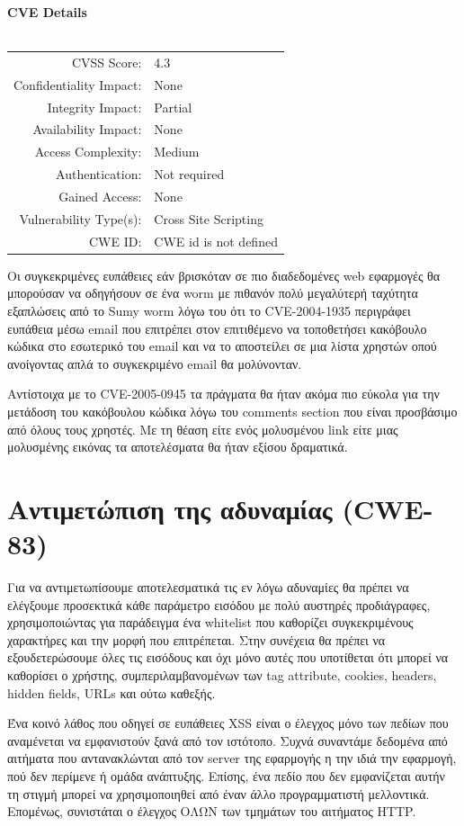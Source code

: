 \textbf{CVE Details}\\ \\
\begin{tabular}{rl}
\hline
CVSS Score: & 	4.3\\
Confidentiality Impact: & \noindent None \\
Integrity Impact: & Partial \\
Availability Impact:  &	None \\
Access Complexity: &	Medium \\
Authentication: 	& Not required \\
Gained Access: 	& None\\
Vulnerability Type(s): & 	Cross Site Scripting	\\
CWE ID: &	CWE id is not defined \\
\hline
\end{tabular}


\noindent
Οι συγκεκριμένες ευπάθειες εάν βρισκόταν σε πιο διαδεδομένες web εφαρμογές θα μπορούσαν να οδηγήσουν σε ένα worm με πιθανόν πολύ μεγαλύτερή ταχύτητα εξαπλώσεις από το Sumy worm λόγω του ότι το CVE-2004-1935 περιγράφει ευπάθεια μέσω email που επιτρέπει στον επιτιθέμενο να τοποθετήσει κακόβουλο κώδικα στο εσωτερικό του email και να το αποστείλει σε μια λίστα χρηστών οπού ανοίγοντας απλά το συγκεκριμένο email θα μολύνονταν.

\noindent
Αντίστοιχα με το CVE-2005-0945 τα πράγματα θα ήταν ακόμα πιο εύκολα για την μετάδοση του κακόβουλου κώδικα λόγω του comments section που είναι προσβάσιμο από όλους τους χρηστές. Με τη θέαση είτε ενός μολυσμένου link είτε μιας μολυσμένης εικόνας τα αποτελέσματα θα ήταν εξίσου δραματικά.


\section{Αντιμετώπιση της αδυναμίας (CWE-83)}
\noindent
Για να αντιμετωπίσουμε αποτελεσματικά τις εν λόγω αδυναμίες θα πρέπει να ελέγξουμε προσεκτικά κάθε παράμετρο εισόδου με πολύ αυστηρές προδιάγραφες, χρησιμοποιώντας για παράδειγμα ένα whitelist που καθορίζει συγκεκριμένους χαρακτήρες και την μορφή που επιτρέπεται. Στην συνέχεια θα πρέπει να εξουδετερώσουμε όλες τις εισόδους και όχι μόνο αυτές που υποτίθεται ότι μπορεί να καθορίσει ο χρήστης, συμπεριλαμβανομένων των tag attribute, cookies, headers, hidden fields, URLs και ούτω καθεξής. 

\noindent
Ένα κοινό λάθος που οδηγεί σε ευπάθειες XSS είναι ο έλεγχος μόνο των πεδίων που αναμένεται να εμφανιστούν ξανά από τον ιστότοπο. Συχνά συναντάμε δεδομένα από αιτήματα που αντανακλώνται από τον server της εφαρμογής η την ιδιά την εφαρμογή, πού δεν περίμενε  ή ομάδα ανάπτυξης. Επίσης, ένα πεδίο που δεν εμφανίζεται αυτήν τη στιγμή μπορεί να χρησιμοποιηθεί από έναν άλλο προγραμματιστή μελλοντικά. Επομένως, συνιστάται ο έλεγχος ΟΛΩΝ των τμημάτων του αιτήματος HTTP.

